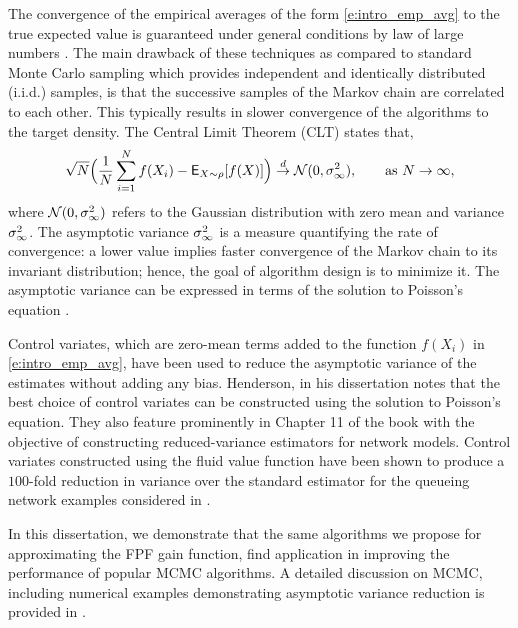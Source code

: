 The convergence of the empirical averages of the form \eqref{e:intro_emp_avg} to the true expected value is guaranteed under general conditions by law of large numbers \cite{MT}. The main drawback of these techniques as compared to standard Monte Carlo sampling which provides independent and identically distributed (i.i.d.) samples, is that the successive samples of the Markov chain are correlated to each other. This typically results in slower convergence of the algorithms to the target density. The Central Limit Theorem (CLT) states that,
\begin{equation}
\sqrt{N} \Bigl(\frac{1}{N} \sum_{i=1}^N f(X_i) - {\sf E}_{X \sim \rho} [f(X)] \Bigr) \overset{d}{\to} \mathcal{N}(0, \sigma^2_\infty),\qquad \text{as } N \to \infty, 
\end{equation}
where $\mathcal{N}(0,\sigma^2_\infty)$ refers to the Gaussian distribution with zero mean and variance $\sigma^2_\infty$. The asymptotic variance $\sigma^2_\infty$ is a measure quantifying the rate of convergence: a lower value implies faster convergence of the Markov chain to its invariant distribution; hence, the goal of algorithm design is to minimize it. The asymptotic variance can be expressed in terms of the solution to Poisson's equation \cite{ctcn}. 

Control variates, which are zero-mean terms added to the function $f(X_i)$ in \eqref{e:intro_emp_avg}, have been used to reduce the asymptotic variance of the estimates without adding any bias. Henderson, in his dissertation \cite{henthesis97} notes that the best choice of control variates can be constructed using the solution to Poisson's equation. They also feature prominently in Chapter 11 of the book \cite{ctcn} with the objective of constructing reduced-variance estimators for network models. Control variates constructed using the fluid value function have been shown to produce a $100$-fold reduction in variance over the standard estimator for the queueing network examples considered in \cite[Chapter~5]{ctcn}. 

In this dissertation, we demonstrate that the same algorithms we propose for approximating the FPF gain function, find application in improving the performance of popular MCMC algorithms. A detailed discussion on MCMC, including numerical examples demonstrating asymptotic variance reduction is provided in .

